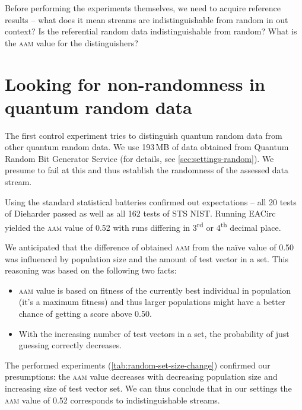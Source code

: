 \documentclass[12pt,oneside]{fithesis2}		%
\renewcommand{\_}{\leavevmode \kern0.0em\vbox{\hrule width0.4em}}
\newcommand{\squarebullet}{\textcolor{black}{\raisebox{0.15em}{\rule{4pt}{4pt}}}}
\newenvironment{myItemize}{
  \begin{itemize}[leftmargin=2em,rightmargin=1em,itemsep=\parskip ,parsep=0em,topsep=0em,partopsep=0em]
  \renewcommand{\labelitemi}{\squarebullet}
  \renewcommand{\labelitemii}{$\diamond$}
}{
  \end{itemize}
}
\begin{document}
Before performing the experiments themselves, we need to acquire reference results -- what does it mean
streams are indistinguishable from random in out context? Is the referential random data indistinguishable from random?
What is the \textsc{aam} value for the distinguishers?

\section{Looking for non-randomness in quantum random data}
\label{sec:control-random-random}

The first control experiment tries to distinguish quantum random data from other quantum random data.
We use 193\,MB of data obtained from Quantum Random Bit Generator Service (for details, see \autoref{sec:settings-random}).
We presume to fail at this and thus establish the randomness of the assessed data stream.

Using the standard statistical batteries confirmed out expectations -- all 20 tests of Dieharder passed as well as
all 162 tests of STS NIST. Running EACirc yielded the \textsc{aam} value of 0.52 with runs differing in 3\textsuperscript{rd}
or 4\textsuperscript{th} decimal place.

We anticipated that the difference of obtained \textsc{aam} from the naïve value of 0.50 was influenced by population size
and the amount of test vector in a set. This reasoning was based on the following two facts:
\begin{myItemize}
\item \textsc{aam} value is based on fitness of the currently best individual in population (it's a maximum fitness) and thus
larger populations might have a better chance of getting a score above 0.50.
\item With the increasing number of test vectors in a set, the probability of just guessing correctly decreases.
\end{myItemize}

\noindent
The performed experiments (\autoref{tab:random-set-size-change}) confirmed our presumptions: the \textsc{aam} value decreases
with decreasing population size and increasing size of test vector set. We can thus conclude that in our settings the \textsc{aam}
value of 0.52 corresponds to indistinguishable streams.
\end{document}
